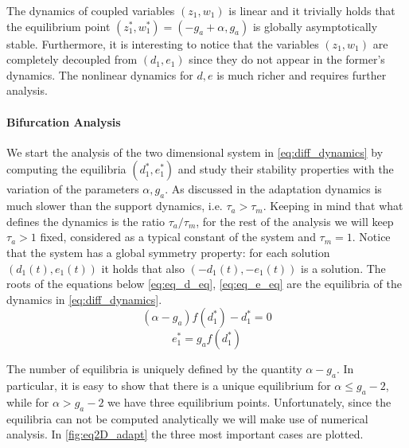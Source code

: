 The dynamics of coupled variables $(z_1, w_1)$ is linear and it trivially holds that the equilibrium point $(z_1^*,w_1^*)=(-g_a+\alpha, g_a)$ is globally asymptotically stable. Furthermore, it is interesting to notice that the variables  $(z_1, w_1)$ are completely decoupled from $(d_1, e_1)$ since they do not appear in the former's dynamics. The nonlinear dynamics for $d, e$ is much richer and requires further analysis. 

\paragraph{Bifurcation Analysis}
We start the analysis of the two dimensional system in \cref{eq:diff_dynamics} by computing the equilibria $(d_1^*,e_1^*)$ and study their stability properties with the variation of the parameters $\alpha, g_a$. As discussed in \cite{LansnerFRC} the adaptation dynamics is much slower than the support dynamics, i.e. $\tau_a > \tau_m$. Keeping in mind that what defines the dynamics is the ratio $\tau_a/\tau_m$, for the rest of the analysis we will keep $\tau_a>1$ fixed, considered as a typical constant of the system and $\tau_m=1$. Notice that the system has a global symmetry property: for each solution $(d_1(t), e_1(t))$ it holds that also $(-d_1(t), -e_1(t))$ is a solution. The roots of the equations below \eqref{eq:eq_d_eq}, \eqref{eq:eq_e_eq} are the equilibria of the dynamics in \eqref{eq:diff_dynamics}.
\begin{equation}
 (\alpha - g_a)f(d_1^*) - d_1^* = 0
\label{eq:eq_d_eq}
\end{equation}
\begin{equation}
e_1^* = g_a f(d_1^*)
\label{eq:eq_e_eq}
\end{equation}

The number of equilibria is uniquely defined by the quantity $\alpha-g_a$. In particular, it is easy to show that there is a unique equilibrium for $\alpha \leq g_a-2$, while for $\alpha > g_a-2$ we have three equilibrium points. Unfortunately, since the equilibria can not be computed analytically we will make use of numerical analysis. In \cref{fig:eq2D_adapt} the three most important cases are plotted.

